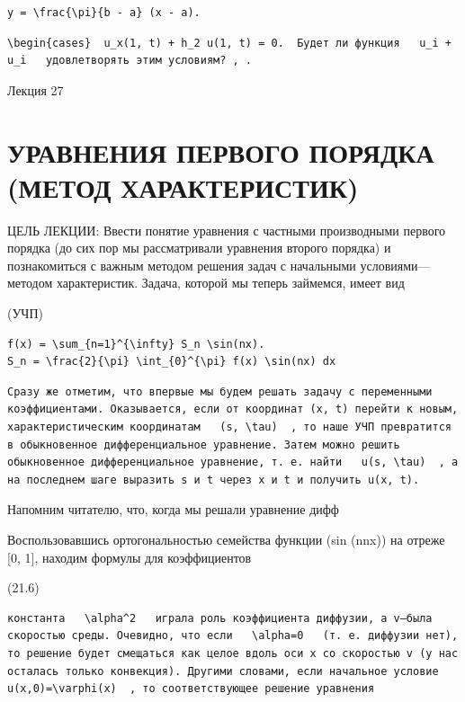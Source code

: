 \documentclass[
  ukrainian,
]{article}
\begin{document}
\begin{verbatim}
y = \frac{\pi}{b - a} (x - a).
\end{verbatim}

\begin{verbatim}
\begin{cases}  u_x(1, t) + h_2 u(1, t) = 0.  Будет ли функция   u_i + u_i   удовлетворять этим условиям? , .
\end{verbatim}

Лекция 27

\section{УРАВНЕНИЯ ПЕРВОГО ПОРЯДКА (МЕТОД
ХАРАКТЕРИСТИК)}\label{ux443ux440ux430ux432ux43dux435ux43dux438ux44f-ux43fux435ux440ux432ux43eux433ux43e-ux43fux43eux440ux44fux434ux43aux430-ux43cux435ux442ux43eux434-ux445ux430ux440ux430ux43aux442ux435ux440ux438ux441ux442ux438ux43a}

ЦЕЛЬ ЛЕКЦИИ: Ввести понятие уравнения с частными производными первого
порядка (до сих пор мы рассматривали уравнения второго порядка) и
познакомиться с важным методом решения задач с начальными
условиями---методом характеристик. Задача, которой мы теперь займемся,
имеет вид

(УЧП)

\begin{verbatim}
f(x) = \sum_{n=1}^{\infty} S_n \sin(nx).
S_n = \frac{2}{\pi} \int_{0}^{\pi} f(x) \sin(nx) dx
\end{verbatim}

\begin{verbatim}
Сразу же отметим, что впервые мы будем решать задачу с переменными коэффициентами. Оказывается, если от координат (x, t) перейти к новым, характеристическим координатам   (s, \tau)  , то наше УЧП превратится в обыкновенное дифференциальное уравнение. Затем можно решить обыкновенное дифференциальное уравнение, т. е. найти   u(s, \tau)  , а на последнем шаге выразить s и t через x и t и получить u(x, t).
\end{verbatim}

Напомним читателю, что, когда мы решали уравнение дифф

Воспользовавшись ортогональностью семейства функции (sin (nnx)) на
отреже {[}0, 1{]}, находим формулы для коэффициентов

(21.6)

\begin{verbatim}
константа   \alpha^2   играла роль коэффициента диффузии, а v—была скоростью среды. Очевидно, что если   \alpha=0   (т. е. диффузии нет), то решение будет смещаться как целое вдоль оси x со скоростью v (у нас осталась только конвекция). Другими словами, если начальное условие   u(x,0)=\varphi(x)  , то соответствующее решение уравнения
\end{verbatim}
\end{document}
